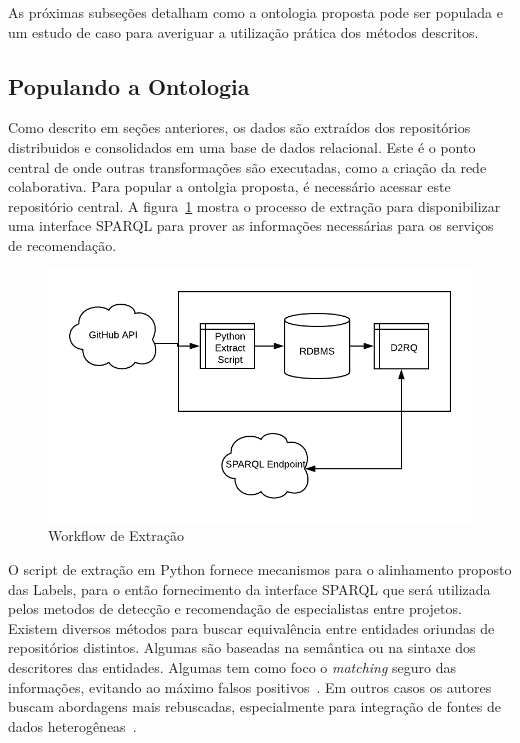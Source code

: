 \documentclass[sigconf]{acmart}
\begin{document}
As próximas subseções detalham como a ontologia proposta pode ser populada e um estudo de caso para averiguar a utilização prática dos métodos descritos.

\subsection{Populando a Ontologia}

Como descrito em seções anteriores, os dados são extraídos dos repositórios distribuidos e consolidados em uma base de dados relacional. Este é o ponto central de onde outras transformações são executadas, como a criação da rede colaborativa. Para popular a ontolgia proposta, é necessário acessar este repositório central. A figura~\ref{fig:workflow_ontologia} mostra o processo de extração para disponibilizar uma interface SPARQL para prover as informações necessárias para os serviços de recomendação.

\begin{figure}[!htbp]
 \centering
 \includegraphics[width=\columnwidth]{workflow_ontologia}
 \caption{Workflow de Extração}\label{fig:workflow_ontologia}
\end{figure}


O script de extração em Python fornece mecanismos para o alinhamento proposto das Labels, para o então fornecimento da interface SPARQL que será utilizada pelos metodos de detecção e recomendação de especialistas entre projetos. Existem diversos métodos para buscar equivalência entre entidades oriundas de repositórios distintos. Algumas são baseadas na semântica ou na sintaxe dos descritores das entidades. Algumas tem como foco o \textit{matching} seguro das informações, evitando ao máximo falsos positivos~\cite{vasilescu2013}. Em outros casos os autores buscam abordagens mais rebuscadas, especialmente para integração de fontes de dados heterogêneas~\cite{silvestri2015}.
\end{document}
